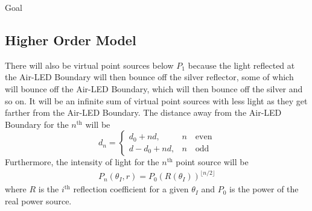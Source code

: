 \documentclass[12pt]{article}
\newcommand{\enterProblemHeader}[1]{
	\rhead{#1}
}
\newenvironment{main_section}[1]{
	\section{#1}
	\enterProblemHeader{#1}
}{
	\pagebreak
}
\begin{document}
\begin{main_section}{Goal}
	\subsection{Higher Order Model}

	There will also be virtual point sources below $P_1$ because the light
	reflected at the Air-LED Boundary will then bounce off the silver reflector,
	some of which will bounce off the Air-LED Boundary, which will then bounce
	off the silver and so on. It will be an infinite sum of virtual point
	sources with less light as they get farther from the Air-LED Boundary. The
	distance away from the Air-LED Boundary for the $n^\text{th}$ will be
	\[
		d_n =
		\begin{cases}
		d_0 + nd, & n\quad\text{even}\\
		d - d_0 + nd, & n\quad\text{odd}
		\end{cases}
	\]
	Furthermore, the intensity of light for the $n^\text{th}$ point source will
	be
	\begin{align*}
		P_n(\theta_I, r) = P_0 (R(\theta_I))^{\lfloor n/2 \rfloor}
	\end{align*}
	where $R$ is the $i^\text{th}$ reflection coefficient for a given
	$\theta_I$ and $P_0$ is the power of the real power source.
\end{main_section}
\end{document}
